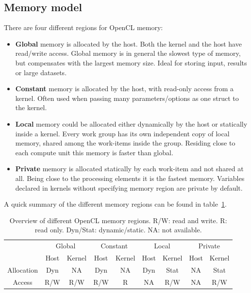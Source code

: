 \subsection{Memory model}
\label{sec:OpenCL:memmodel}
There are four different regions for OpenCL memory:
\begin{itemize}
\item \textbf{Global} memory is allocated by the host. Both the kernel and the host have read/write access. Global memory is in general the slowest type of memory, but compensates with the largest memory size. Ideal for storing input, results or large datasets.
\item \textbf{Constant} memory is allocated by the host, with read-only access from a kernel. Often used when passing many parameters/options as one struct to the kernel.
\item \textbf{Local} memory could be allocated either dynamically by the host or statically inside a kernel. Every work group has its own independent copy of local memory, shared among the work-items inside the group. Residing close to each compute unit this memory is faster than global. 
\item \textbf{Private} memory is allocated statically by each work-item and not shared at all. Being close to the processing elements it is the fastest memory. Variables declared in kernels without specifying memory region are private by default.
\end{itemize}
A quick summary of the different memory regions can be found in table~\ref{tab:OpenCL:memory}.

\begin{table}
\begin{center}
\begin{tabular}{c|cc|cc|cc|cc}
& \multicolumn{2}{c|}{Global} & \multicolumn{2}{c|}{Constant} & \multicolumn{2}{c|}{Local} & \multicolumn{2}{c}{Private}\\
& Host & Kernel& Host & Kernel& Host & Kernel& Host & Kernel \\
\hline
Allocation & Dyn & NA & Dyn & NA & Dyn & Stat & NA & Stat\\ 
Access & R/W & R/W & R/W & R & NA & R/W & NA & R/W\\ 
\hline 
\end{tabular} 
\caption{Overview of different OpenCL memory regions. R/W: read and write. R: read only. Dyn/Stat: dynamic/static. NA: not available.}
\label{tab:OpenCL:memory}
\end{center}
\end{table}



